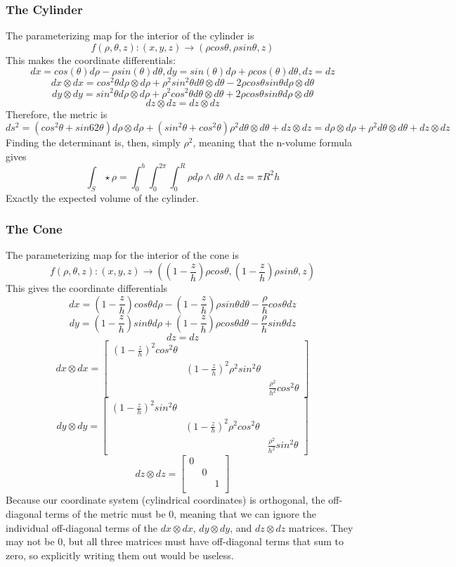 \documentclass{article}
\begin{document}
\subsubsection{The Cylinder}
The parameterizing map for the interior of the cylinder is
\[
f(\rho, \theta, z): (x, y, z) \rightarrow (\rho cos \theta, \rho sin \theta, z)
\]
This makes the coordinate differentials:
\[
dx = cos(\theta) d\rho - \rho sin(\theta) d\theta, dy = sin(\theta) d\rho + \rho cos(\theta) d\theta, dz = dz
\]
\[
dx \otimes dx = cos^2 \theta d\rho \otimes d\rho + \rho^2 sin^2 \theta d\theta \otimes d\theta - 2\rho cos\theta sin\theta d\rho \otimes d\theta
\]
\[
dy \otimes dy = sin^2 \theta d\rho \otimes d\rho + \rho^2 cos^2 \theta d\theta \otimes d\theta + 2\rho cos\theta sin\theta d\rho \otimes d\theta
\]
\[
dz \otimes dz = dz \otimes dz
\]
Therefore, the metric is
\[
ds^2 = (cos^2 \theta + sin62 \theta) d\rho \otimes d\rho + (sin^2 \theta + cos^2 \theta) \rho^2 d\theta \otimes d\theta + dz \otimes dz = d\rho \otimes d\rho + \rho^2 d\theta \otimes d\theta + dz \otimes dz
\]
Finding the determinant is, then, simply $\rho^2$, meaning that the n-volume formula gives
\[
\int_S \star \rho = \int_0^h\int_0^{2\pi}\int_0^R \rho d\rho \wedge d\theta \wedge dz = \pi R^2h
\]
Exactly the expected volume of the cylinder.

\subsubsection{The Cone}
The parameterizing map for the interior of the cone is
\[
f(\rho, \theta, z): (x, y, z) \rightarrow ((1-\frac{z}{h})\rho cos \theta, (1-\frac{z}{h})\rho sin \theta, z)
\]
This gives the coordinate differentials
\[
dx = (1-\frac{z}{h}) cos\theta d\rho - (1-\frac{z}{h})\rho sin\theta d\theta - \frac{\rho}{h}cos\theta dz
\]
\[
dy = (1-\frac{z}{h}) sin\theta d\rho + (1-\frac{z}{h})\rho cos\theta d\theta - \frac{\rho}{h}sin\theta dz
\]
\[
dz = dz
\]
\[
dx \otimes dx = \begin{bmatrix}
 (1-\frac{z}{h})^2 cos^2 \theta &
  &
  \\
  &
 (1-\frac{z}{h})^2 \rho^2 sin^2 \theta &
  \\
  &
  &
 \frac{\rho^2}{h^2} cos^2 \theta
\end{bmatrix}
\]
\[
dy \otimes dy = \begin{bmatrix}
 (1-\frac{z}{h})^2 sin^2 \theta &
  &
  \\
  &
 (1-\frac{z}{h})^2 \rho^2 cos^2 \theta &
  \\
  &
  &
 \frac{\rho^2}{h^2} sin^2 \theta
\end{bmatrix}
\]
\[
dz \otimes dz = \begin{bmatrix}
 0 &   &   \\
   & 0 &   \\
   &   & 1 \\
\end{bmatrix}
\]
Because our coordinate system (cylindrical coordinates) is orthogonal, the off-diagonal terms of the metric must be 0, meaning that we can ignore the individual off-diagonal terms of the $dx \otimes dx$, $dy \otimes dy$, and $dz \otimes dz$ matrices. They may not be 0, but all three matrices must have off-diagonal terms that sum to zero, so explicitly writing them out would be useless.
\end{document}
